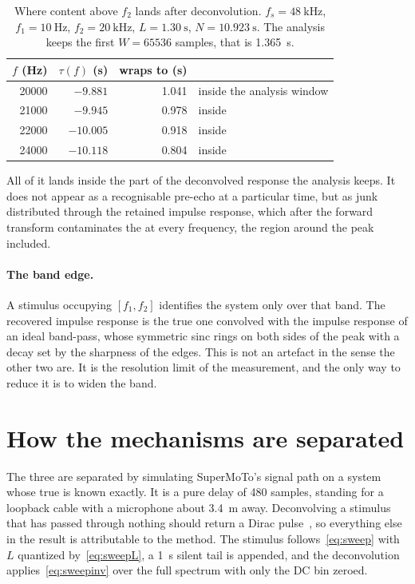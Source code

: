 \begin{table}[ht]
\centering
\caption{Where content above $f_2$ lands after deconvolution.
$f_s = \SI{48}{\kilo\hertz}$, $f_1 = \SI{10}{\hertz}$,
$f_2 = \SI{20}{\kilo\hertz}$, $L = \SI{1.30}{\second}$,
$N = \SI{10.923}{\second}$. The analysis keeps the first
$W = \num{65536}$ samples, that is \SI{1.365}{\second}.}
\label{tab:sweepwrap}
\begin{tabular}{rrrl}
\toprule
$f$ (Hz) & $\tau(f)$ (s) & wraps to (s) & \\
\midrule
20000 & $-9.881$  & 1.041 & inside the analysis window \\
21000 & $-9.945$  & 0.978 & inside \\
22000 & $-10.005$ & 0.918 & inside \\
24000 & $-10.118$ & 0.804 & inside \\
\bottomrule
\end{tabular}
\end{table}

All of it lands inside the part of the deconvolved response the analysis keeps. It does not appear as a recognisable pre-echo at a particular time, but as junk distributed through the retained impulse response, which after the forward transform contaminates the  at every frequency, the region around the peak included.

\paragraph{The band edge.} A stimulus occupying $[f_1, f_2]$ identifies the system only over that band. The recovered impulse response is the true one convolved with the impulse response of an ideal band-pass, whose symmetric sinc rings on both sides of the peak with a decay set by the sharpness of the edges. This is not an artefact in the sense the other two are. It is the resolution limit of the measurement, and the only way to reduce it is to widen the band.

\section{How the mechanisms are separated}
The three are separated by simulating SuperMoTo's signal path on a system whose true  is known exactly. It is a pure delay of 480 samples, standing for a loopback cable with a microphone about \SI{3.4}{\metre} away. Deconvolving a stimulus that has passed through nothing should return a Dirac pulse~\cite{Farina2007}, so everything else in the result is attributable to the method. The stimulus follows~\eqref{eq:sweep} with $L$ quantized by~\eqref{eq:sweepL}, a \SI{1}{\second} silent tail is appended, and the deconvolution applies~\eqref{eq:sweepinv} over the full spectrum with only the DC bin zeroed.

